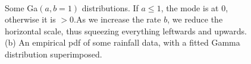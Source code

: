 \documentclass[graybox, envcountchap, twocolumn]{styles/svmult}
\begin{document}
\begin{figure}[hbtp]
\centering
{} \\
\caption{Some Ga$(a, b=1)$ distributions. If $a \leq 1$, the mode is at 0, otherwise it is $>0$.As we increase the rate $b$, we reduce the horizontal scale, thus squeezing everything leftwards and upwards. (b) An empirical pdf of some rainfall data, with a fitted Gamma distribution superimposed.}
\label{fig:gamma-distribution} 
\end{figure}
\end{document}
